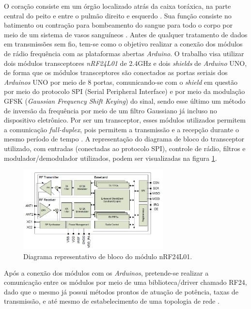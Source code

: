 \documentclass[conference]{IEEEtran}
\begin{document}
O coração consiste em um órgão localizado atrás da caixa toráxica, na parte central do peito e entre o pulmão direito e esquerdo \cite{nih2011}. Sua função consiste no batimento ou contração para bombeamento do sangue para todo o corpo por meio de um sistema de vasos sanguíneos \cite{gray1979}.
Antes de qualquer tratamento de dados em transmiss\~oes sem fio, tem-se como o objetivo realizar a conex\~ao dos m\'odulos de r\'adio frequ\^encia com as plataformas abertas \textit{Arduino}. O trabalho visa utilizar dois m\'odulos transceptores \textit{nRF24L01} de 2.4GHz e dois \textit{shields} de \textit{Arduino} UNO, de forma que os m\'odulos transceptores s\~ao conectados as portas seriais dos \textit{Arduinos} UNO por meio de 8 portas, comunicando-se com o \textit{shield} em quest\~ao por meio do protocolo SPI (Serial Peripheral Interface) e por meio da modula\c{c}\~ao GFSK (\textit{Gaussian Frequency Shift Keying}) do sinal, sendo esse \'ultimo um m\'etodo de invers\~ao da frequ\^encia por meio de um filtro Gaussiano \cite{pdsGFSKModulation} j\'a incluso no dispositivo eletr\^onico. Por ser um transceptor, esses m\'odulos utilizados permitem a comunica\c{c}\~ao \textit{full-duplex}, pois permitem a transmiss\~ao e a recep\c{c}\~ao durante o mesmo per\'iodo de tempo \cite{datasheetNRF24L01}. A representa\c{c}\~ao do diagrama de bloco do transceptor utilizado, com entradas (conectadas ao protocolo SPI), controle de r\'adio, filtros e modulador/demodulador utilizados, podem ser visualizadas na figura \ref{diagramaNrf24l01}.

\begin{figure}[!b]
\centering
\includegraphics[width=3in]{diagramanrf24l01}
\caption{Diagrama representativo de bloco do m\'odulo nRF24L01.}
\label{diagramaNrf24l01}
\end{figure}

Ap\'os a conex\~ao dos m\'odulos com os \textit{Arduinos}, pretende-se realizar a comunica\c{c}\~ao entre os m\'odulos por meio de uma biblioteca/driver chamado RF24, dado que o mesmo j\'a possui m\'etodos prontos de atua\c{c}\~ao de pot\^encia, taxas de transmiss\~ao, e at\'e mesmo de estabelecimento de uma topologia de rede \cite{driverRF24}.
\end{document}
